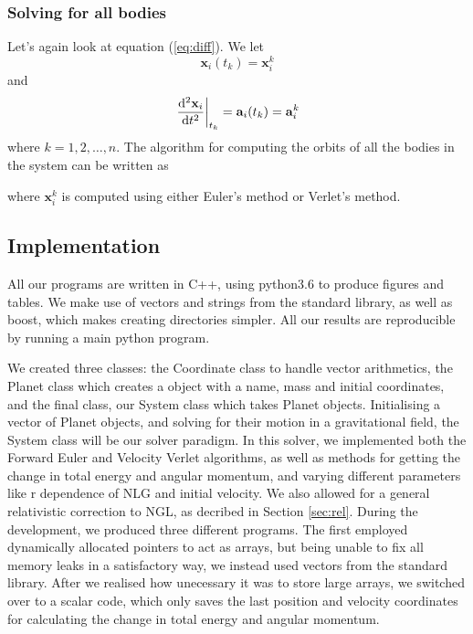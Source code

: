 \subsubsection{Solving for all bodies}
Let's again look at equation (\ref{eq:diff}). We let
\begin{equation}
\mathbf{x}_i(t_k)=\mathbf{x}_{i}^k
\end{equation}
and
\begin{equation}
\left.\dv[2]{\mathbf{x}_i}{t}\right\rvert_{t_k} = \mathbf{a}_i(t_k)=\mathbf{a}_{i}^k
\end{equation}
where $k=1,2,\ldots,n$. The algorithm for computing the orbits of all the bodies in the system can be written as
\begin{algorithm}[h!]
	\SetAlgoLined
\end{algorithm}
where $\mathbf{x}_{i}^k$ is computed using either Euler's method or Verlet's method.

\subsection{Implementation}
All our programs are written in C++, using python3.6 to produce figures and tables.
We make use of vectors and strings from the standard library, as well as boost,
which makes creating directories simpler. All our results are reproducible
by running a main python program.

We created three classes: the Coordinate class to handle vector arithmetics, the Planet
class which creates a object with a name, mass and initial coordinates,
and the final class, our System class which takes Planet objects. Initialising
a vector of Planet objects, and solving for their motion in a gravitational field, the System
class will be our solver paradigm. In this solver, we implemented both the Forward Euler and
Velocity Verlet algorithms, as well as methods for getting the change in total energy and angular
momentum, and varying different parameters like r dependence of NLG and initial velocity.
We also allowed for a general relativistic correction to NGL, as decribed in Section \ref{sec:rel}.
During the development, we produced three different programs. The first employed dynamically allocated pointers to act as arrays, but being unable to fix all memory leaks in a satisfactory way, we instead used vectors from the standard library.
After we realised how unecessary it was to store large arrays, we switched over to a scalar code, which only saves the last position and velocity coordinates for calculating the change in total energy and angular momentum.

